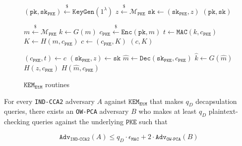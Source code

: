 \documentclass[floatrow,journal=tches,submission]{iacrtrans}
\newcommand{\pke}{\texttt{PKE}}
\newcommand{\keygen}{\texttt{KeyGen}}
\newcommand{\encrypt}{\texttt{Enc}}
\newcommand{\decrypt}{\texttt{Dec}}
\newcommand{\kem}{\texttt{KEM}}
\newcommand{\encap}{\texttt{Encap}}
\newcommand{\decap}{\texttt{Decap}}
\newcommand{\etm}{\texttt{EtM}}  %
\newcommand{\mac}{\texttt{MAC}}
\newcommand{\pk}{\texttt{pk}}
\newcommand{\sk}{\texttt{sk}}
\newcommand{\leftsample}{\stackrel{\$}{\leftarrow}}
\begin{document}
\begin{figure}[H]
    \center
    \begin{algorithm}[H]
        \caption{$\keygen_\etm$}\label{alg:etm-keygen}
        \begin{algorithmic}[1]
            \State $(\pk, \sk_\pke) \leftsample \keygen(1^\lambda)$
            \State $z \leftsample \mathcal{M}_\pke$
            \State $\sk \leftarrow (\sk_\pke, z)$
            \State \Return $(\pk, \sk)$
        \end{algorithmic}
    \end{algorithm}
    \begin{algorithm}[H]
        \caption{$\encap_\etm(\pk)$}\label{alg:etm-encap}
        \begin{algorithmic}[1]
            \State $m \leftsample \mathcal{M}_\pke$
            \State $k \leftarrow G(m)$
            \State $c_\pke \leftsample \encrypt(\pk, m)$
            \State $t \leftarrow \mac(k, c_\pke)$
            \State $K \leftarrow H(m, c_\pke)$
            \State $c \leftarrow (c_\pke, K)$
            \State \Return $(c, K)$
        \end{algorithmic}
    \end{algorithm}
    \begin{algorithm}[H]
        \caption{$\decap_\etm(\sk, c)$}\label{alg:etm-decap}
        \begin{algorithmic}[1]
            \State $(c_\pke, t) \leftarrow c$
            \State $(\sk_\pke, z) \leftarrow \sk$
            \State $\hat{m} \leftarrow \decrypt(\sk_\pke, c_\pke)$
            \State $\hat{k} \leftarrow G(\hat{m})$
            \If{$\mac(\hat{k}, c_\pke) \neq t$}
                \State \Return $H(z, c_\pke)$
            \EndIf
            \State \Return $H(\hat{m}, c_\pke)$
        \end{algorithmic}
    \end{algorithm}
    \caption{$\kem_\etm$ routines}\label{fig:etm-routines} 
\end{figure}

\begin{theorem}\label{thm:ow-pca-implies-kem-ind-cca2}
    For every \texttt{IND-CCA2} adversary $A$ against $\kem_\etm$ that makes $q_D$ decapsulation queries, there exists an \texttt{OW-PCA} adversary $B$ who makes at least $q_D$ plaintext-checking queries against the underlying $\pke$ such that

    \begin{equation*}
        \texttt{Adv}_\texttt{IND-CCA2}(A) \leq q_D \cdot \epsilon_\mac + 2 \cdot \texttt{Adv}_\texttt{OW-PCA}(B)
    \end{equation*}
\end{theorem}
\end{document}
